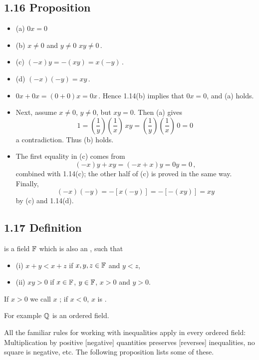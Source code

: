 \subsection*{1.16 Proposition}
\begin{itemize}
\item[] (a) $0 x = 0$
\item[] (b) $x \neq 0$ and $y \neq 0$  $xy \neq 0\,.$
\item[] (c) $(-x) y = - (xy) = x(-y)\,.$
\item[] (d) $(-x)(-y) = xy\,.$
\item[]  $0x + 0x = (0 + 0) x = 0x\,.$ Hence 1.14(b) implies that $0x = 0$, and (a) holds. 
\item[] Next, assume $x \neq 0$, $y \neq 0$, but $xy = 0$. Then (a) gives
$$ 1 = \left(\frac{1}{y}\right) \left(\frac{1}{x}\right)\, xy = \left(\frac{1}{y}\right) \left(\frac{1}{x}\right)\, 0 = 0\,$$ 
a contradiction. Thus (b) holds.
\item[] The first equality in (c) comes from $$(-x)y + xy = (-x +x) y = 0 y = 0\,,$$ combined with 1.14(c); the other half of (c) is proved in the same way. Finally, 
$$(-x)(-y) = -[x(-y)] = -[-(xy)] = xy$$ by (c) and 1.14(d).
\end{itemize}

\subsection*{1.17 Definition}
 is a field $\mathbb{F}$ which is also an , such that
\begin{itemize}
\item[] (i) $x + y < x + z$ if $x, y, z \in \mathbb{F}$ and $y < z$,   
\item[] (ii) $xy > 0$ if $x \in \mathbb{F}$, $y \in \mathbb{F}$, $x > 0$ and $y > 0$. 
\end{itemize}

If $x > 0$ we call $x$ ; if $x < 0$, $x$ is .

For example $\mathbb{Q}$ is an ordered field. 

All the familiar rules for working with inequalities apply in every ordered field: Multiplication by positive [negative]
quantities preserves [reverses] inequalities, no square is negative, etc. The following proposition lists some of these.

